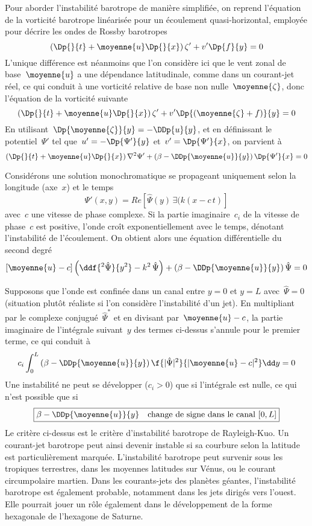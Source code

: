 \sk
Pour aborder l'instabilité barotrope de manière simplifiée,
on reprend l'équation de la vorticité barotrope 
linéarisée pour un écoulement quasi-horizontal,
employée pour décrire les ondes de Rossby barotropes
\[
\left( \Dp{}{t} + \moyenne{u} \Dp{}{x} \right) \zeta' + v' \Dp{f}{y} = 0
\]
\noindent L'unique différence est néanmoins que l'on considère ici
que le vent zonal de base~$\moyenne{u}$ a une dépendance latitudinale,
comme dans un courant-jet réel, ce qui conduit à une vorticité relative
de base non nulle~$\moyenne{\zeta}$, donc l'équation de la vorticité suivante
\[
\left( \Dp{}{t} + \moyenne{u} \Dp{}{x} \right) \zeta' + v' \Dp{(\moyenne{\zeta}+f)}{y} = 0
\]
En utilisant~$\Dp{\moyenne{\zeta}}{y} = -\DDp{u}{y}$,
et en définissant le potentiel~$\Psi'$ 
tel que~$u'=-\Dp{\Psi'}{y}$
et~$v'=\Dp{\Psi'}{x}$, on parvient à
\[
\left( \Dp{}{t} + \moyenne{u} \Dp{}{x} \right) \nabla^2 \Psi' + \left( \beta - \DDp{\moyenne{u}}{y} \right) \Dp{\Psi'}{x} = 0
\]

\sk
Considérons une solution monochromatique se propageant uniquement
selon la longitude (axe~$x$) et le temps
\[
\Psi'(x,y) = Re \left[ \hat{\Psi}(y) \, \exi{(k(x-c\,t)} \right]
\]
\noindent avec~$c$ une vitesse de phase complexe. Si la partie
imaginaire~$c_i$ de la vitesse de phase~$c$ est positive, l'onde
croît exponentiellement avec le temps, dénotant l'instabilité de l'écoulement.
On obtient alors une équation différentielle du second degré
\[
\left[ \moyenne{u} - c \right] \left( \ddf{^2\hat{\Psi}}{y^2} - k^2 \, \hat{\Psi} \right) + \left( \beta - \DDp{\moyenne{u}}{y} \right) \hat{\Psi} = 0
\]

\sk
Supposons que l'onde est confinée dans un canal entre $y=0$ et $y=L$ avec~$\hat{\Psi}=0$
(situation plutôt réaliste si l'on considère l'instabilité d'un jet).
En multipliant par le complexe conjugué~$\hat{\Psi}^*$ et en divisant par~$\moyenne{u}-c$,
la partie imaginaire de l'intégrale suivant~$y$ des termes ci-dessus
s'annule pour le premier terme, ce qui conduit à
\[
c_i \int_0^L \left( \beta - \DDp{\moyenne{u}}{y} \right) \f{|\hat{\Psi}|^2}{|\moyenne{u}-c|^2} \dd y = 0
\]
Une instabilité ne peut se développer ($c_i > 0$) que
si l'intégrale est nulle, ce qui n'est possible que si
\[
\boxed{
\beta - \DDp{\moyenne{u}}{y} \quad \textrm{change de signe dans le canal } [0,L]
}
\]
\noindent Le critère ci-dessus est le critère d'instabilité barotrope de Rayleigh-Kuo.
Un courant-jet barotrope peut ainsi devenir instable 
si sa courbure selon la latitude est particulièrement marquée.
L'instabilité barotrope peut survenir
sous les tropiques terrestres,
dans les moyennes latitudes sur Vénus,
ou le courant circumpolaire martien.
Dans les courants-jets des planètes géantes,
l'instabilité barotrope est également probable,
notamment dans les jets dirigés vers l'ouest.
Elle pourrait jouer un rôle également
dans le développement de la forme hexagonale de l'hexagone de Saturne.




